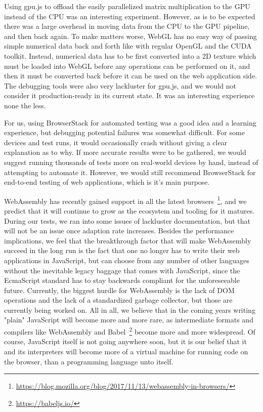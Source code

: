 \documentclass[conference]{IEEEtran}
\begin{document}
Using gpu.js to offload the easily parallelized matrix multiplication to the
GPU instead of the CPU was an interesting experiment. However, as is to be
expected there was a large overhead in moving data from the CPU to the GPU
pipeline, and then back again. To make matters worse, WebGL has no easy way of
passing simple numerical data back and forth like with regular OpenGL and the
CUDA toolkit. Instead, numerical data has to be first converted into a 2D
texture which must be loaded into WebGL before any operations can be performed
on it, and then it must be converted back before it can be used on the web
application side. The debugging tools were also very lackluster for gpu.js, and
we would not consider it production-ready in its current state. It was an
interesting experience none the less.

For us, using BrowserStack for automated testing was a good idea and a learning
experience, but debugging potential failures was somewhat difficult. For some
devices and test runs, it would occasionally crash without giving a clear
explanation as to why. If more accurate results were to be gathered, we would
suggest running thousands of tests more on real-world devices by hand, instead
of attempting to automate it. However, we would still recommend BrowserStack
for end-to-end testing of web applications, which is it's main purpose.

WebAssembly has recently gained support in all the latest
browsers~\footnote{\url{https://blog.mozilla.org/blog/2017/11/13/webassembly-in-browsers/}},
and we predict that it will continue to grow as the ecosystem and tooling for
it matures. During our tests, we ran into some issues of lackluster
documentation, but that will not be an issue once adaption rate increases.
Besides the performance implications, we feel that the breakthrough factor that
will make WebAssembly succeed in the long run is the fact that one no longer
has to write their web applications in JavaScript, but can choose from any
number of other languages without the inevitable legacy baggage that comes with
JavaScript, since the EcmaScript standard has to stay backwards compliant for
the unforeseeable future. Currently, the biggest hurdle for WebAssembly is the
lack of DOM operations and the lack of a standardized garbage collector, but
those are currently being worked on. All in all, we believe that in the coming
years writing "plain" JavaScript will become more and more rare, as
intermediate formats and compilers like WebAssembly and
Babel~\footnote{\url{https://babeljs.io/}} become more and more widespread. Of
course, JavaScript itself is not going anywhere soon, but it is our belief that
it and its interpreters will become more of a virtual machine for running code
on the browser, than a programming language unto itself.



\end{document}
